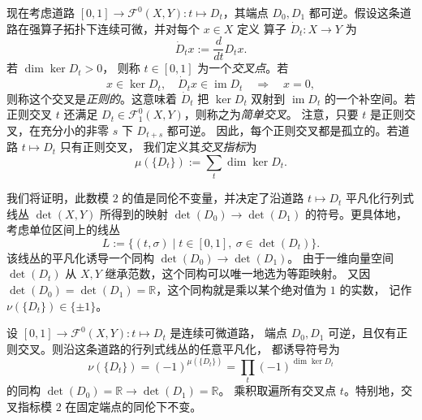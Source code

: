 现在考虑道路 $[0,1]\to\mathcal F^0(X,Y):t\mapsto D_t$，其端点
$D_0,D_1$ 都可逆。假设这条道路在强算子拓扑下连续可微，并对每个 $x\in X$ 定义
算子 $\dot D_t:X\to Y$ 为
\[
  \dot D_tx:=\frac{d}{dt}D_tx.
\]
若 $\dim\ker D_t>0$，
则称 $t\in[0,1]$ 为一个\emph{交叉点}。若
\[
  x\in\ker D_t,\quad \dot D_tx\in\operatorname{im}D_t
  \quad\Longrightarrow\quad x=0,
\]
则称这个交叉是\emph{正则的}。这意味着 $\dot D_t$ 把 $\ker D_t$
双射到 $\operatorname{im}D_t$ 的一个补空间。若正则交叉 $t$ 还满足
$D_t\in\mathcal F_1^0(X,Y)$，则称之为\emph{简单交叉}。
注意，只要 $t$ 是正则交叉，在充分小的非零 $s$ 下 $D_{t+s}$ 都可逆。
因此，每个正则交叉都是孤立的。若道路 $t\mapsto D_t$ 只有正则交叉，
我们定义其\emph{交叉指标}为
\begin{equation}\label{eq:A-2-4}
  \mu(\{D_t\}):=\sum_t\dim\ker D_t.
\end{equation}

我们将证明，此数模 $2$ 的值是同伦不变量，并决定了沿道路
$t\mapsto D_t$ 平凡化行列式线丛 $\det(X,Y)$ 所得到的映射
$\det(D_0)\to\det(D_1)$ 的符号。更具体地，考虑单位区间上的线丛
\[
  L:=\bigl\{(t,\sigma)\mid t\in[0,1],\ \sigma\in\det(D_t)\bigr\}.
\]
该线丛的平凡化诱导一个同构 $\det(D_0)\to\det(D_1)$。
由于一维向量空间 $\det(D_t)$ 从 $X,Y$ 继承范数，这个同构可以唯一地选为等距映射。
又因 $\det(D_0)=\det(D_1)=\mathbb R$，这个同构就是乘以某个绝对值为 $1$ 的实数，
记作 $\nu(\{D_t\})\in\{\pm1\}$。

\begin{proposition}\label{prop:A-2-4}
设 $[0,1]\to\mathcal F^0(X,Y):t\mapsto D_t$ 是连续可微道路，
端点 $D_0,D_1$ 可逆，且仅有正则交叉。则沿这条道路的行列式线丛的任意平凡化，
都诱导符号为
\begin{equation}\label{eq:A-2-5}
  \nu(\{D_t\})=(-1)^{\mu(\{D_t\})}
  =\prod_t(-1)^{\dim\ker D_t}
\end{equation}
的同构 $\det(D_0)=\mathbb R\to\det(D_1)=\mathbb R$。
乘积取遍所有交叉点 $t$。特别地，交叉指标模 $2$ 在固定端点的同伦下不变。
\end{proposition}

